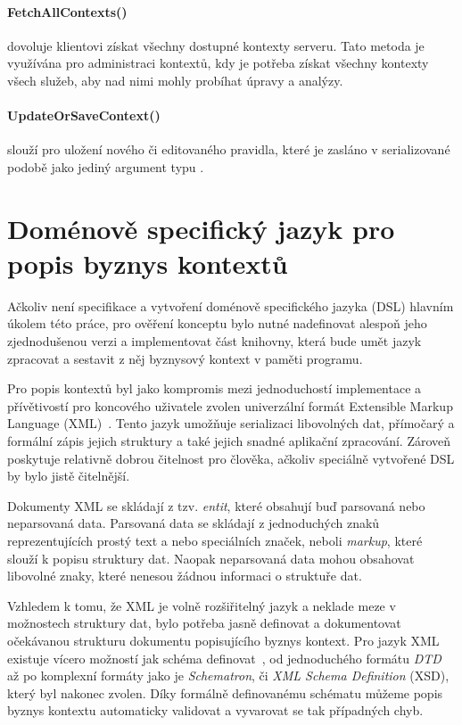 \paragraph{FetchAllContexts()} dovoluje klientovi získat všechny
dostupné kontexty serveru. Tato metoda je využívána pro administraci
kontextů, kdy je potřeba získat všechny kontexty všech služeb, aby
nad nimi mohly probíhat úpravy a analýzy.

\paragraph{UpdateOrSaveContext()} slouží pro uložení nového či
editovaného pravidla, které je zasláno v serializované podobě
jako jediný argument typu .

\section{Doménově specifický jazyk pro popis byznys kontextů}\label{sec:dsl-impl}

Ačkoliv není specifikace a vytvoření doménově specifického jazyka (\gls{DSL})
hlavním úkolem této práce, pro ověření konceptu bylo nutné nadefinovat
alespoň jeho zjednodušenou verzi a implementovat část knihovny, která
bude umět jazyk zpracovat a sestavit z něj byznysový kontext v paměti programu.

Pro popis kontextů byl jako kompromis mezi jednoduchostí implementace
a přívětivostí pro koncového uživatele zvolen univerzální formát Extensible
Markup Language (\gls{XML})~\cite{bray1997extensible}. Tento
jazyk umožňuje serializaci libovolných dat, přímočarý a formální
zápis jejich struktury a také jejich snadné aplikační zpracování.
Zároveň poskytuje relativně dobrou čitelnost pro člověka, ačkoliv
speciálně vytvořené \gls{DSL} by bylo jistě čitelnější.

Dokumenty \gls{XML} se skládají z tzv. \textit{entit}, které obsahují
buď parsovaná nebo neparsovaná data. Parsovaná data se skládají
z jednoduchých znaků reprezentujících prostý text a nebo
speciálních značek, neboli \textit{markup}, které slouží k popisu
struktury dat. Naopak neparsovaná data mohou obsahovat libovolné
znaky, které nenesou žádnou informaci o struktuře dat.

Vzhledem k tomu, že \gls{XML} je volně rozšiřitelný jazyk a neklade
meze v možnostech struktury dat, bylo potřeba jasně definovat
a dokumentovat očekávanou strukturu dokumentu popisujícího
byznys kontext. Pro jazyk \gls{XML} existuje vícero možností jak schéma
definovat~\cite{lee2000comparative}, od jednoduchého formátu
\textit{DTD} až po komplexní formáty jako je \textit{Schematron}, či
\textit{XML Schema Definition} (\gls{XSD}), který byl nakonec zvolen.
Díky formálně definovanému schématu můžeme popis byznys kontextu
automaticky validovat a vyvarovat se tak případných chyb.

